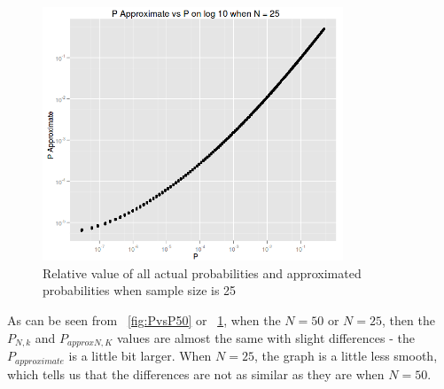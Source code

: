 \documentclass[12pt]{article}
\begin{document}
\begin{figure}[!h]
	\centering
  \includegraphics[width=0.8\textwidth]{PvsP25}
	\caption{Relative value of all actual probabilities and approximated probabilities when sample size is 25}
	\label{fig:PvsP25}
\end{figure}

As can be seen from ~\ref{fig:PvsP50} or ~\ref{fig:PvsP25}, when the $N = 50$ or $N = 25$, then the $P_{N, k}$ and $P_{approx N, K}$ values are almost the same with slight differences - the $P_{approximate}$ is a little bit larger. When $N = 25$, the graph is a little less smooth, which tells us that the differences are not as similar as they are when $N = 50$.
\end{document}

